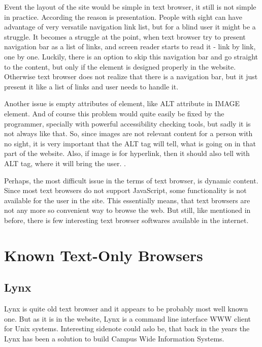 Event the layout of the site would be simple in text browser, it still
is not simple in practice. According \textcite[Chapter 5]{webbie} the
reason is presentation. People with sight can have advantage of very
versatile navigation link list, but for a blind user it might be a
struggle. It becomes a struggle at the point, when text browser try to
present navigation bar as a list of links, and screen reader starts to
read it - link by link, one by one. Luckily, there is an option to
skip this navigation bar and go straight to the content, but only if
the element is designed properly in the website. Otherwise text
browser does not realize that there is a navigation bar, but it just
present it like a list of links and user needs to handle it.

Another issue is empty attributes of element, like ALT attribute in
IMAGE element. And of course this problem would quite easily be fixed
by the programmer, specially with powerful accessibility checking
tools, but sadly it is not always like that. So, since images are not
relevant content for a person with no sight, it is very important that
the ALT tag will tell, what is going on in that part of the
website. Also, if image is for hyperlink, then it should also tell
with ALT tag, where it will bring the user. \parencite[Chapter
  5]{webbie}.

Perhaps, the most difficult issue in the terms of text browser, is
dynamic content. Since most text browsers do not support JavaScript,
some functionality is not available for the user in the site. This
essentially means, that text browsers are not any more so convenient
way to browse the web. But still, like mentioned in before,
there is few interesting text browser softwares available in the
internet.


\section{Known Text-Only Browsers}
\label{tb-browsers}

\subsection{Lynx}
\label{tb-lynx}
Lynx is quite old text browser and it appears to be probably most well known one. But as it is in the \textcite{lynx} website, Lynx is a command line interface WWW client for Unix systems. Interesting sidenote could aslo be, that back in the years the Lynx has been a solution to build Campus Wide Information Systems. 

